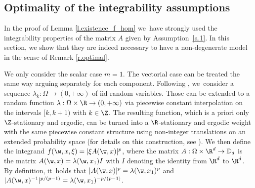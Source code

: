 \subsection{Optimality of the integrability assumptions}
In the proof of Lemma \ref{l.existence_f_hom} we~have strongly used the integrability properties of the matrix $A$ given by Assumption~\ref{a.1}. In this section, we show that they are indeed necessary to have a non-degenerate model in the sense of Remark \ref{r.optimal}.
\begin{example}\label{ex:optimal}
We only consider the scalar case $m=1$. The vectorial case can be treated the same way arguing separately for each component. Following \cite{NSS}, we~consider a sequence $\lambda_k:\Omega\to (0,+\infty)$ of iid random variables. Those can be extended to a random function $\lambda:\Omega\times\R\to (0,+\infty)$ via piecewise constant interpolation on the intervals $[k,k+1)$ with $k\in\Z$. The resulting function, which is a priori only $\Z$-stationary and ergodic, can be turned into a $\R$-stationary and ergodic weight with the same piecewise constant structure using non-integer translations on an extended probability space (for details on this construction, see \cite[p.\,236]{JKO}). We then define the integrand $f(\w,x,\xi)=|\xi A(\w,x)|^p$, where the matrix $A:\Omega\times\R^d\to\mathbb{D}_d$ is the matrix $A(\w,x)=\lambda(\w,x_1)I$ with $I$ denoting the identity from $\R^d$ to $\R^d$. By definition, it~holds that $|A(\w,x)|^p=\lambda(\w,x_1)^p$ and $|A(\w,x)^{-1}|^{p/(p-1)}=\lambda(\w,x_1)^{-p/(p-1)}$.


\end{example}

